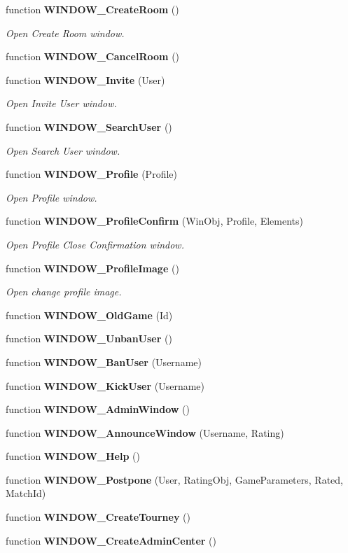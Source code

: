 \begin{CompactItemize}
function {\bf WINDOW\_\-CreateRoom} ()
\begin{CompactList}\small\item\em Open Create Room window. \item\end{CompactList}\item 
function {\bf WINDOW\_\-CancelRoom} ()
\item 
function {\bf WINDOW\_\-Invite} (User)
\begin{CompactList}\small\item\em Open Invite User window. \item\end{CompactList}\item 
function {\bf WINDOW\_\-SearchUser} ()
\begin{CompactList}\small\item\em Open Search User window. \item\end{CompactList}\item 
function {\bf WINDOW\_\-Profile} (Profile)
\begin{CompactList}\small\item\em Open Profile window. \item\end{CompactList}\item 
function {\bf WINDOW\_\-ProfileConfirm} (WinObj, Profile, Elements)
\begin{CompactList}\small\item\em Open Profile Close Confirmation window. \item\end{CompactList}\item 
function {\bf WINDOW\_\-ProfileImage} ()
\begin{CompactList}\small\item\em Open change profile image. \item\end{CompactList}\item 
function {\bf WINDOW\_\-OldGame} (Id)
\item 
function {\bf WINDOW\_\-UnbanUser} ()
\item 
function {\bf WINDOW\_\-BanUser} (Username)
\item 
function {\bf WINDOW\_\-KickUser} (Username)
\item 
function {\bf WINDOW\_\-AdminWindow} ()
\item 
function {\bf WINDOW\_\-AnnounceWindow} (Username, Rating)
\item 
function {\bf WINDOW\_\-Help} ()
\item 
function {\bf WINDOW\_\-Postpone} (User, RatingObj, GameParameters, Rated, MatchId)
\item 
function {\bf WINDOW\_\-CreateTourney} ()
\item 
function {\bf WINDOW\_\-CreateAdminCenter} ()
\end{CompactItemize}


